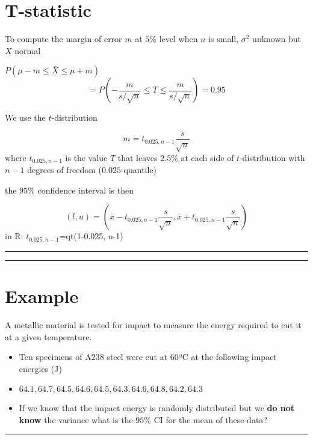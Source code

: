 \documentclass[
]{book}
\begin{document}
\hypertarget{t-statistic-5}{%
\section{T-statistic}\label{t-statistic-5}}

To compute the margin of error \(m\) at \(5\%\) level when \(n\) is small, \(\sigma^2\) unknown but \(X\) normal

\(P(\mu-m \leq \bar{X} \leq\mu + m)\)
\[=P(-\frac{m}{s/\sqrt{n}} \leq T \leq\frac{m}{s/\sqrt{n}})=0.95\]

We use the \(t\)-distribution

\[m=t_{0.025, n-1} \frac{s}{\sqrt{n}}\]
where \(t_{0.025, n-1}\) is the value \(T\) that leaves \(2.5\%\) at each side of \(t\)-distribution with \(n-1\) degrees of freedom (\(0.025\)-quantile)

the \(95\%\) confidence interval is then

\[(l,u)=(\bar{x}-t_{0.025, n-1} \frac{s}{\sqrt{n}}, \bar{x}+t_{0.025, n-1} \frac{s}{\sqrt{n}})\]
in R: \(t_{0.025, n-1}\)=qt(1-0.025, n-1)

\begin{center}\rule{0.5\linewidth}{0.5pt}\end{center}

\begin{center}\rule{0.5\linewidth}{0.5pt}\end{center}

\hypertarget{example-19}{%
\section{Example}\label{example-19}}

A metallic material is tested for impact to measure the energy required to cut it at a given temperature.

\begin{itemize}
\item
  Ten specimens of A238 steel were cut at 60ºC at the following impact energies (J)
\item
  \(64.1, 64.7, 64.5, 64.6, 64.5, 64.3, 64.6, 64.8, 64.2, 64.3\)
\item
  If we know that the impact energy is randomly distributed but we \textbf{do not know} the variance what is the \(95\%\) CI for the mean of these data?
\end{itemize}

\begin{center}\rule{0.5\linewidth}{0.5pt}\end{center}
\end{document}
